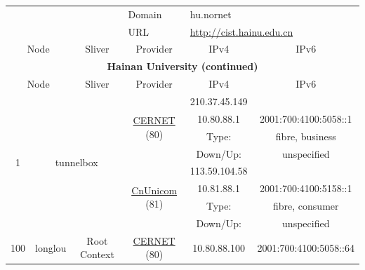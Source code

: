 \begin{small}
\begin{center}
\begin{longtable}{|c|c|c|c|c|c|c|c|}
 \multicolumn{4}{|c|}{} & \multicolumn{1}{|l|}{Domain} & \multicolumn{3}{|l|}{\index{hu.nornet}hu.nornet} \\* \cline{5-5}\cline{6-6}\cline{7-7}\cline{8-8}
 \multicolumn{4}{|c|}{} & \multicolumn{1}{|l|}{URL} & \multicolumn{3}{|l|}{\url{http://cist.hainu.edu.cn}} \\ \hline
 \multicolumn{2}{|p{8em}|}{Node} & \multicolumn{2}{|p{8em}|}{Sliver} & \multicolumn{2}{|p{8em}|}{Provider} & IPv4 & IPv6 \\ \hline
\endfirsthead
\hline
 \multicolumn{8}{|c|}{\textbf{Hainan University (continued)}} \\ \hline
 \multicolumn{2}{|p{8em}|}{Node} & \multicolumn{2}{|p{8em}|}{Sliver} & \multicolumn{2}{|p{8em}|}{Provider} & IPv4 & IPv6 \\ \hline
\endhead
 \multirow{8}{*}{\tiny{1}} & \multicolumn{3}{|c|}{\multirow{8}{*}{\tiny{tunnelbox}}} & \multicolumn{2}{|c|}{\multirow{4}{*}{\tiny{\href{http://www.cernet.edu.cn}{CERNET} (80)}}} & \tiny{210.37.45.149} & \frownie{} \\* \cline{7-7}\cline{8-8}
  & \multicolumn{3}{|c|}{} & \multicolumn{2}{|c|}{} & \tiny{10.80.88.1} & \tiny{2001:700:4100:5058::1} \\* \cline{7-7}\cline{8-8}
  & \multicolumn{3}{|c|}{} & \multicolumn{2}{|c|}{} & Type: & fibre, business \\* \cline{7-7}\cline{8-8}
  & \multicolumn{3}{|c|}{} & \multicolumn{2}{|c|}{} & Down/Up:  & unspecified \\* \cline{5-5}\cline{6-6}\cline{7-7}\cline{8-8}
  & \multicolumn{3}{|c|}{} & \multicolumn{2}{|c|}{\multirow{4}{*}{\tiny{\href{http://www.chinaunicom.com}{CnUnicom} (81)}}} & \tiny{113.59.104.58} & \frownie{} \\* \cline{7-7}\cline{8-8}
  & \multicolumn{3}{|c|}{} & \multicolumn{2}{|c|}{} & \tiny{10.81.88.1} & \tiny{2001:700:4100:5158::1} \\* \cline{7-7}\cline{8-8}
  & \multicolumn{3}{|c|}{} & \multicolumn{2}{|c|}{} & Type: & fibre, consumer \\* \cline{7-7}\cline{8-8}
  & \multicolumn{3}{|c|}{} & \multicolumn{2}{|c|}{} & Down/Up:  & unspecified \\ \hline
 \multirow{20}{*}{\tiny{100}} & \multicolumn{1}{|l|}{\multirow{20}{*}{\tiny{longlou}}} & \multicolumn{2}{|c|}{\multirow{2}{*}{\tiny{Root Context}}} & \multicolumn{2}{|c|}{\tiny{\href{http://www.cernet.edu.cn}{CERNET} (80)}} & \tiny{10.80.88.100} & \tiny{2001:700:4100:5058::64} \\* \cline{5-5}\cline{6-6}\cline{7-7}\cline{8-8}

\end{longtable}
\end{center}
\end{small}
